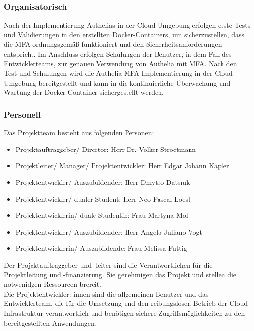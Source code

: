\subsubsection{Organisatorisch}
\label{sec:Organisatorisch}
Nach der Implementierung Authelias in der Cloud-Umgebung erfolgen erste Tests und Validierungen in den erstellten 
Docker-Containers, um sicherzustellen, dass die MFA ordnungsgemäß funktioniert und den Sicherheitsanforderungen entspricht. 
Im Anschluss erfolgen Schulungen der Benutzer, in dem Fall des Entwicklerteams, zur genauen Verwendung von Authelia mit MFA. 
Nach den Test und Schulungen wird die Authelia-MFA-Implementierung in der Cloud-Umgebung bereitgestellt und kann in die 
kontinuierliche Überwachung und Wartung der Docker-Container sichergestellt werden.

\subsubsection{Personell}
\label{sec:Personell}
Das Projektteam besteht aus folgenden Personen:
\begin{itemize}
	\item Projektauftraggeber/ Director: Herr Dr. Volker Stroetmann
	\item Projektleiter/ Manager/ Projektentwickler: Herr Edgar Johann Kapler
	\item Projektentwickler/ Auszubildender: Herr Dmytro Datsiuk
	\item Projektentwickler/ dualer Student: Herr Neo-Pascal Loest
	\item Projektentwicklerin/ duale Studentin: Frau Martyna Mol 
	\item Projektentwickler/ Auszubildender: Herr Angelo Juliano Vogt
	\item Projektentwicklerin/ Auszubildende: Frau Melissa Futtig
\end{itemize}
Der Projektauftraggeber und -leiter sind die Verantwortlichen für die 
Projektleitung und -finanzierung. Sie genehmigen das Projekt und stellen 
die notwenidgen Ressourcen brereit.
\\Die Projektentwickler: innen sind die allgemeinen Benutzer und das Entwicklerteam, die 
für die Umsetzung und den reibungslosen Betrieb der Cloud-Infrastruktur verantwortlich 
und benötigen sichere Zugriffsmöglichkeiten zu den bereitgestellten Anwendungen.